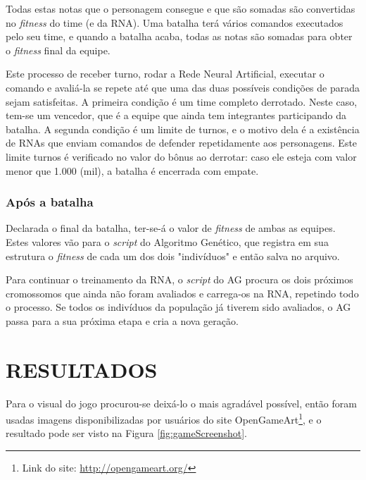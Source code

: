 \documentclass[
	12pt,					%
	openright,				%
	oneside,				%
	a4paper,				%
	bibjustif,				%
	chapter=TITLE,			%
	english,				%
	brazil,					%
	]{abntex2}
\begin{document}
	Todas estas notas que o personagem consegue e que são somadas são convertidas no \textit{fitness} do time (e da RNA).
	Uma batalha terá vários comandos executados pelo seu time,
	e quando a batalha acaba,
	todas as notas são somadas para obter o \textit{fitness} final da equipe.
	
	Este processo de receber turno,
	rodar a Rede Neural Artificial,
	executar o comando e avaliá-la
	se repete até que uma das duas possíveis condições de parada sejam satisfeitas.
	A primeira condição é um time completo derrotado.
	Neste caso, tem-se um vencedor, que é a equipe que ainda tem integrantes participando da batalha.
	A segunda condição é um limite de turnos,
	e o motivo dela é a existência de RNAs que enviam comandos de defender repetidamente aos personagens.
	Este limite turnos é verificado no valor do bônus ao derrotar:
	caso ele esteja com valor menor que 1.000 (mil),
	a batalha é encerrada com empate.
	
	\subsection{Após a batalha}
	Declarada o final da batalha,
	ter-se-á o valor de \textit{fitness} de ambas as equipes.
	Estes valores vão para o \textit{script} do Algoritmo Genético,
	que registra em sua estrutura o \textit{fitness} de cada um dos dois "indivíduos"{} e então salva no arquivo.
	
	Para continuar o treinamento da RNA,
	o \textit{script} do AG procura os dois próximos cromossomos que ainda não foram avaliados e carrega-os na RNA,
	repetindo todo o processo.
	Se todos os indivíduos da população já tiverem sido avaliados,
	o AG passa para a sua próxima etapa e cria a nova geração.


\FloatBarrier
\newpage %
\chapter{RESULTADOS}

	Para o visual do jogo procurou-se deixá-lo o mais agradável possível,
	então foram usadas imagens disponibilizadas por usuários do site OpenGameArt\footnote{Link do site: \url{http://opengameart.org/}},
	e o resultado pode ser visto na Figura \ref{fig:gameScreenshot}.
\end{document}
